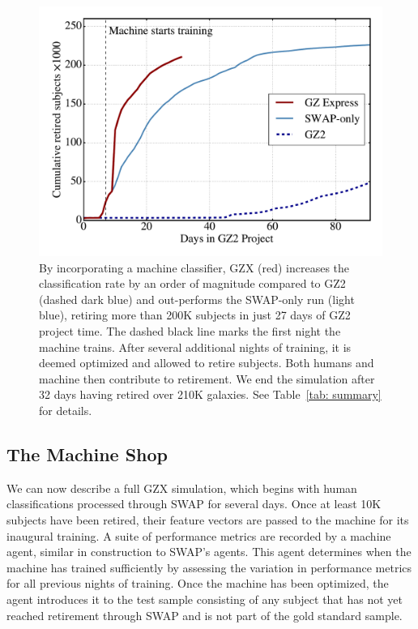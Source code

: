 \documentclass[twocolumn]{aastex6}
\begin{document}
\begin{figure}[t!]
\centering
\includegraphics[width=5.5in]{f7.pdf}
\caption{By incorporating a machine classifier, GZX (red) increases the classification rate by an order of magnitude compared to GZ2 (dashed dark blue) and out-performs the SWAP-only run (light blue), retiring more than 200K subjects in just 27 days of GZ2 project time. The dashed black line marks the first night the machine trains. After several additional nights of training, it is deemed optimized and allowed to retire subjects. Both humans and machine then contribute to retirement. We end the simulation after 32 days having retired over 210K galaxies. See Table~\ref{tab: summary} for details. \label{fig: money}}
\end{figure}


\subsection{The Machine Shop}\label{sec: machine shop}
We can now describe a full GZX simulation, which begins with human classifications 
processed through SWAP for several days.   
Once at least 10K subjects have been retired, their feature vectors are passed to 
the machine for its inaugural training. 
A suite of performance metrics are recorded by a machine agent, similar
in construction to SWAP's agents. This agent determines 
when the machine has trained sufficiently by assessing the variation
in performance metrics for all previous nights of training. 
Once the machine has been optimized, the agent introduces it to the test sample
consisting of any subject that has not yet reached retirement through SWAP 
and is not part of the gold standard sample.  
\end{document}

